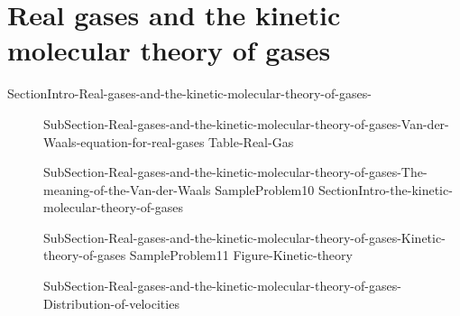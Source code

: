 \documentclass[main.tex]{subfiles}
\newcommand\chapterlabel{Ch-Gas}\setcounter{figurenewcounter}{0}\setcounter{tablenewcounter}{0}\setcounter{formulanewcounter}{0}
\begin{document}
 \section{Real gases and the kinetic molecular theory of gases }
{SectionIntro-Real-gases-and-the-kinetic-molecular-theory-of-gases-}
\sloppy 
\begin{description}
 \item[] {SubSection-Real-gases-and-the-kinetic-molecular-theory-of-gases-Van-der-Waals-equation-for-real-gases}
{Table-Real-Gas}		
\item[]  {SubSection-Real-gases-and-the-kinetic-molecular-theory-of-gases-The-meaning-of-the-Van-der-Waals}
{SampleProblem10}
{SectionIntro-the-kinetic-molecular-theory-of-gases}
 \item[] 
{SubSection-Real-gases-and-the-kinetic-molecular-theory-of-gases-Kinetic-theory-of-gases}
{SampleProblem11}
 {Figure-Kinetic-theory}
 \item[] {SubSection-Real-gases-and-the-kinetic-molecular-theory-of-gases-Distribution-of-velocities}
\end{description}

\clearpage\thispagestyle{empty}\mbox{}\clearpage
 \clearpage\thispagestyle{empty}\mbox{}
\end{document}
